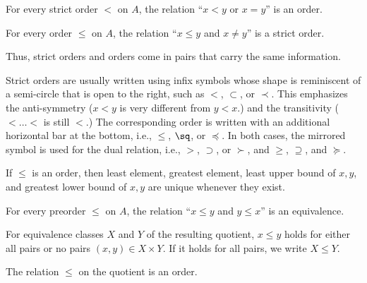 \begin{theorem}
For every strict order $<$ on $A$, the relation ``$x<y$ or $x=y$'' is an order.

For every order $\leq$ on $A$, the relation ``$x\leq y$ and $x\neq y$'' is a strict order.
\end{theorem}

Thus, strict orders and orders come in pairs that carry the same information.

Strict orders are usually written using infix symbols whose shape is reminiscent of a semi-circle that is open to the right, such as $<$, $\subset$, or $\prec$.
This emphasizes the anti-symmetry ($x< y$ is very different from $y<x$.) and the transitivity ($< \ldots <$ is still $<$.)
The corresponding order is written with an additional horizontal bar at the bottom, i.e., $\leq$, $\sq$, or $\preceq$.
In both cases, the mirrored symbol is used for the dual relation, i.e., $>$, $\supset$, or $\succ$, and $\geq$, $\supseteq$, and $\succeq$. 

\begin{theorem}\label{thm:math:binrel}
If $\leq$ is an order, then least element, greatest element, least upper bound of $x,y$, and greatest lower bound of $x,y$ are unique whenever they exist.
\end{theorem}

\begin{theorem}
For every preorder $\leq$ on $A$, the relation ``$x\leq y$ and $y\leq x$'' is an equivalence.

For equivalence classes $X$ and $Y$ of the resulting quotient, $x\leq y$ holds for either all pairs or no pairs $(x,y)\in X\times Y$.
If it holds for all pairs, we write $X\leq Y$.

The relation $\leq$ on the quotient is an order.
\end{theorem}